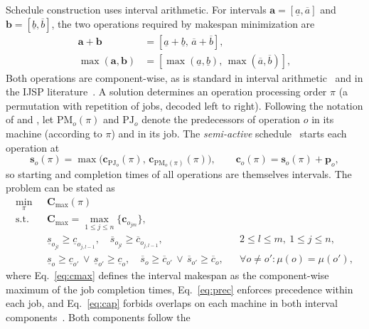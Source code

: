 \documentclass[review,authoryear,11pt]{elsarticle}
\begin{document}
Schedule construction uses interval arithmetic. For intervals
$\mathbf{a}=[\underline{a},\overline{a}]$ and
$\mathbf{b}=[\underline{b},\overline{b}]$,
the two operations required by makespan minimization are
\begin{align}
\mathbf{a} + \mathbf{b} &= [\underline{a}+\underline{b},\,
\overline{a}+\overline{b}],\\
\max(\mathbf{a},\mathbf{b}) &= [\max(\underline{a},\underline{b}),\,
\max(\overline{a},\overline{b})],
\end{align}
Both operations are component-wise, as is standard in interval
arithmetic~\citep{Moore2009} and in the IJSP
literature~\citep{DiazGA2020}. A solution determines an operation
processing order $\pi$ (a permutation with repetition of jobs, decoded
left to right). Following the notation of \citet{DiazGA2020} and
\citet{DiazICAE2023},
let $\mathrm{PM}_o(\pi)$ and $\mathrm{PJ}_o$ denote the predecessors of operation $o$ in its
machine (according to $\pi$) and in its job. The \emph{semi-active}
schedule~\citep{Sprecher1995} starts each operation at
\begin{equation}
\mathbf{s}_o(\pi) = \max\big(\mathbf{c}_{\mathrm{PJ}_o}(\pi),\,
\mathbf{c}_{\mathrm{PM}_o(\pi)}(\pi)\big), \qquad
\mathbf{c}_o(\pi) = \mathbf{s}_o(\pi) + \mathbf{p}_o,
\label{eq:sgs}
\end{equation}
so starting and completion times of all operations are themselves intervals.
The problem can be stated as
\begin{align}
\min_{\pi}\; & \mathbf{C}_{\max}(\pi) \label{eq:obj}\\
\text{s.t.}\quad
& \mathbf{C}_{\max} = \max_{1 \le j \le n} \{\mathbf{c}_{o_{jm}}\},
  \label{eq:cmax}\\
& \underline{s}_{o_{jl}} \ge \underline{c}_{o_{j,l-1}}, \quad
  \overline{s}_{o_{jl}} \ge \overline{c}_{o_{j,l-1}},
  && 2 \le l \le m,\ 1 \le j \le n, \label{eq:prec}\\
& \underline{s}_o \ge \underline{c}_{o'} \,\vee\,
  \underline{s}_{o'} \ge \underline{c}_o, \quad
  \overline{s}_o \ge \overline{c}_{o'} \,\vee\,
  \overline{s}_{o'} \ge \overline{c}_o,
  && \forall o \ne o': \mu(o) = \mu(o'), \label{eq:cap}
\end{align}
where Eq.~\eqref{eq:cmax} defines the interval makespan as the
component-wise maximum of the job completion times,
Eq.~\eqref{eq:prec} enforces precedence within each job, and
Eq.~\eqref{eq:cap} forbids overlaps on each machine in both interval
components~\citep{DiazGA2020,DiazICAE2023}. Both components follow the
\end{document}
